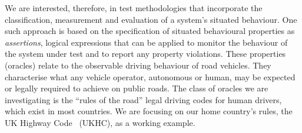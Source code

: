 %
%
%
We are interested, therefore, in test methodologies that incorporate the classification, measurement and evaluation of a system's situated behaviour. One such approach is based on the specification of situated behavioural properties as \emph{assertions}, logical expressions that can be applied 
to monitor the behaviour of the system under test and to report any property violations. 
%
These properties (oracles) relate to the observable driving behaviour of road vehicles. They characterise what any vehicle operator, autonomous or human, %
%
%
may be expected or legally required to achieve on public roads. 
%
The class of oracles we are investigating is the ``rules of the road'' legal driving codes for human drivers, which exist in most countries. We are focusing on our home country's rules, the UK Highway Code~\cite{highwayCode} (UKHC), as a working example.


